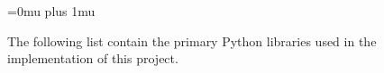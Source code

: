 \documentclass[12pt]{article}
\begin{document}










\newpage



\Urlmuskip=0mu plus 1mu\relax
\printbibliography


The following list contain the primary Python libraries used in the implementation of this project.

\vspace{-6pt}
\end{document}
